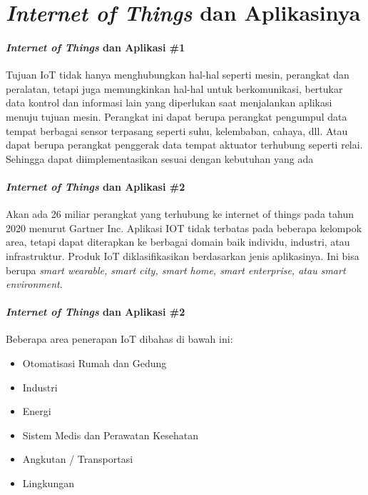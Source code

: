

\section{\textit{Internet of Things} dan Aplikasinya}
\begin{frame}{\insertsectionhead}
	\framesubtitle{\textit{Internet of Things} dan Aplikasi \#1}
	\justifying
	Tujuan IoT tidak hanya menghubungkan hal-hal seperti mesin, perangkat dan peralatan, tetapi juga memungkinkan hal-hal untuk berkomunikasi, bertukar data kontrol dan informasi lain yang diperlukan saat menjalankan aplikasi menuju tujuan mesin.
	\vfill
	Perangkat ini dapat berupa perangkat pengumpul data tempat berbagai sensor terpasang seperti suhu, kelembaban, cahaya, dll. Atau dapat berupa perangkat penggerak data tempat aktuator terhubung seperti relai.
	\vfill
	Sehingga dapat diimplementasikan sesuai dengan kebutuhan yang ada
\end{frame}

\begin{frame}{\insertsectionhead}
	\framesubtitle{\textit{Internet of Things} dan Aplikasi \#2}
	\justifying
	Akan ada 26 miliar perangkat yang terhubung ke internet of things pada tahun 2020 menurut Gartner Inc. Aplikasi IOT tidak terbatas pada beberapa kelompok area, tetapi dapat diterapkan ke berbagai domain baik individu, industri, atau infrastruktur.
	\vfill
	Produk IoT diklasifikasikan berdasarkan jenis aplikasinya. Ini bisa berupa \textit{smart wearable, smart city, smart home, smart enterprise, atau smart environment}.
\end{frame}

\begin{frame}{\insertsectionhead}
	\framesubtitle{\textit{Internet of Things} dan Aplikasi \#2}
	\justifying
	Beberapa area penerapan IoT dibahas di bawah ini:
	\vfill
	\begin{itemize}
		\item Otomatisasi Rumah dan Gedung
		\item Industri
		\item Energi
		\item Sistem Medis dan Perawatan Kesehatan
		\item Angkutan / Transportasi
		\item Lingkungan
	\end{itemize}
\end{frame}


